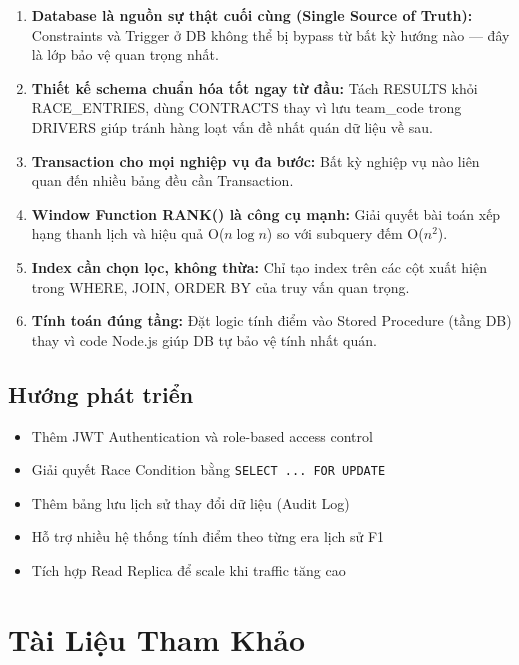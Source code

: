 \documentclass[13pt, a4paper]{report}
\begin{document}
\begin{enumerate}[leftmargin=1.5cm]
  \item \textbf{Database là nguồn sự thật cuối cùng (Single Source of Truth):} Constraints và Trigger ở DB không thể bị bypass từ bất kỳ hướng nào --- đây là lớp bảo vệ quan trọng nhất.
  \item \textbf{Thiết kế schema chuẩn hóa tốt ngay từ đầu:} Tách RESULTS khỏi RACE\_ENTRIES, dùng CONTRACTS thay vì lưu team\_code trong DRIVERS giúp tránh hàng loạt vấn đề nhất quán dữ liệu về sau.
  \item \textbf{Transaction cho mọi nghiệp vụ đa bước:} Bất kỳ nghiệp vụ nào liên quan đến nhiều bảng đều cần Transaction.
  \item \textbf{Window Function RANK() là công cụ mạnh:} Giải quyết bài toán xếp hạng thanh lịch và hiệu quả O($n \log n$) so với subquery đếm O($n^2$).
  \item \textbf{Index cần chọn lọc, không thừa:} Chỉ tạo index trên các cột xuất hiện trong WHERE, JOIN, ORDER BY của truy vấn quan trọng.
  \item \textbf{Tính toán đúng tầng:} Đặt logic tính điểm vào Stored Procedure (tầng DB) thay vì code Node.js giúp DB tự bảo vệ tính nhất quán.
\end{enumerate}

\section{Hướng phát triển}

\begin{itemize}[leftmargin=1.5cm]
  \item Thêm JWT Authentication và role-based access control
  \item Giải quyết Race Condition bằng \texttt{SELECT ... FOR UPDATE}
  \item Thêm bảng lưu lịch sử thay đổi dữ liệu (Audit Log)
  \item Hỗ trợ nhiều hệ thống tính điểm theo từng era lịch sử F1
  \item Tích hợp Read Replica để scale khi traffic tăng cao
\end{itemize}

\chapter*{Tài Liệu Tham Khảo}
\end{document}
